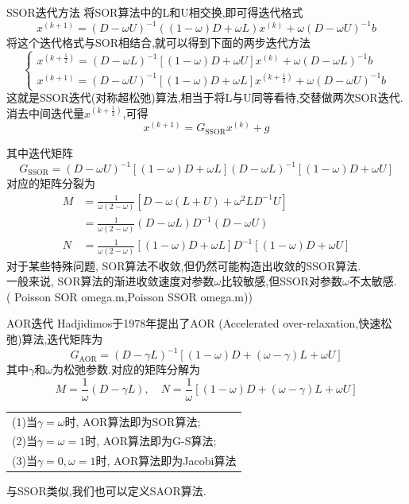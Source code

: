 \documentclass[notheorems,serif]{beamer}
\begin{document}
\begin{frame}
{SSOR迭代方法}
将SOR算法中的L和U相交换,即可得迭代格式
$$
x^{(k+1)}=(D-\omega U)^{-1}((1-\omega) D+\omega L) x^{(k)}+\omega(D-\omega U)^{-1} b
$$
将这个迭代格式与SOR相结合,就可以得到下面的两步迭代方法
$$
\left\{\begin{array}{l}{x^{\left(k+\frac{1}{2}\right)}=(D-\omega L)^{-1}[(1-\omega) D+\omega U] x^{(k)}+\omega(D-\omega L)^{-1} b} \\ {x^{(k+1)}=(D-\omega U)^{-1}[(1-\omega) D+\omega L] x^{\left(k+\frac{1}{2}\right)}+\omega(D-\omega U)^{-1} b}\end{array}\right.
$$
这就是{\color{blue}SSOR迭代}(对称超松弛)算法,相当于将L与U同等看待,交替做两次SOR迭代.\\
消去中间迭代量$x^{(k+\frac{1}{2})}$,可得
$$
x^{(k+1)}=G_{\mathrm{SSOR}} x^{(k)}+g
$$
\end{frame}

\begin{frame}
其中迭代矩阵
$$
G_{\mathrm{SSOR}}=(D-\omega U)^{-1}[(1-\omega) D+\omega L](D-\omega L)^{-1}[(1-\omega) D+\omega U]
$$
对应的矩阵分裂为
$$
\begin{aligned} M &=\frac{1}{\omega(2-\omega)}\left[D-\omega(L+U)+\omega^{2} L D^{-1} U\right] \\ &=\frac{1}{\omega(2-\omega)}(D-\omega L) D^{-1}(D-\omega U) \\ N &=\frac{1}{\omega(2-\omega)}[(1-\omega) D+\omega L] D^{-1}[(1-\omega) D+\omega U] \end{aligned}
$$
对于某些特殊问题, SOR算法不收敛,但仍然可能构造出收敛的SSOR算法.\\
一般来说, SOR算法的渐进收敛速度对参数$\omega$比较敏感,但SSOR对参数$\omega$不太敏感.\\
({\color{blue} Poisson SOR omega.m,Poisson SSOR omega.m)})\\
\end{frame}


\begin{frame}
{AOR迭代}
Hadjidimos于1978年提出了AOR (Accelerated over-relaxation,快速松弛)算法,迭代矩阵为
$$
G_{\mathrm{AOR}}=(D-\gamma L)^{-1}[(1-\omega) D+(\omega-\gamma) L+\omega U]
$$
其中$\gamma$和$\omega$为松弛参数.对应的矩阵分解为
$$
M=\frac{1}{\omega}(D-\gamma L), \quad N=\frac{1}{\omega}[(1-\omega) D+(\omega-\gamma) L+\omega U]
$$
\begin{tabular}{l}
\qquad  (1)当$\gamma=\omega$时, AOR算法即为SOR算法;\\
\qquad  (2)当$\gamma=\omega=1$时, AOR算法即为G-S算法;\\
\qquad  (3)当$\gamma=0,\omega=1$时, AOR算法即为Jacobi算法
\end{tabular}
与SSOR类似,我们也可以定义SAOR算法.
\end{frame}
\end{document}
